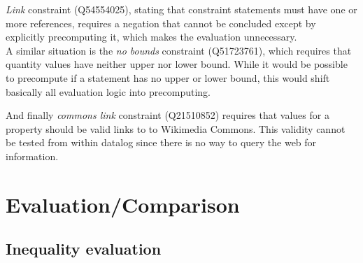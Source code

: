 \documentclass[hyperref,bachelorofscience,fleqn]{cgvpub}
\begin{document}
\emph{Link} constraint (Q54554025), stating that constraint statements must have one or more references, requires a negation that cannot be concluded except by explicitly precomputing it, which makes the evaluation unnecessary. \\
A similar situation is the \emph{no bounds} constraint (Q51723761), which requires that quantity values have neither upper nor lower bound. While it would be possible to precompute if a statement has no upper or lower bound, this would shift basically all evaluation logic into precomputing.

And finally \emph{commons link} constraint (Q21510852) requires that values for a property should be valid links to to Wikimedia Commons. This validity cannot be tested from within datalog since there is no way to query the web for information.

\chapter{Evaluation/Comparison}

\section{Inequality evaluation}\label{sec_inequality_evaluation}
\end{document}
